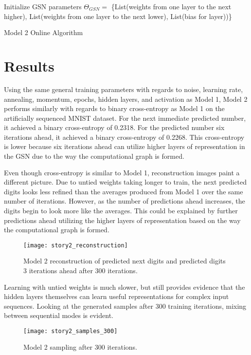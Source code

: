 \begin{algorithm}[h!]
	Initialize GSN parameters \(\Theta_{GSN} = \) \{List(weights from one layer to the next higher), List(weights from one layer to the next lower), List(bias for layer))\}\;
	\caption{ Model 2 Online Algorithm }
\end{algorithm}

\section{Results}

Using the same general training parameters with regards to noise, learning rate, annealing, momentum, epochs, hidden layers, and activation as Model 1, Model 2 performs similarly with regards to binary cross-entropy as Model 1 on the artificially sequenced MNIST dataset. For the next immediate predicted number, it achieved a binary cross-entropy of 0.2318.  For the predicted number six iterations ahead, it achieved a binary cross-entropy of 0.2268. This cross-entropy is lower because six iterations ahead can utilize higher layers of representation in the GSN due to the way the computational graph is formed.

Even though cross-entropy is similar to Model 1, reconstruction images paint a different picture. Due to untied weights taking longer to train, the next predicted digits looks less refined than the averages produced from Model 1 over the same number of iterations. However, as the number of predictions ahead increases, the digits begin to look more like the averages. This could be explained by further predictions ahead utilizing the higher layers of representation based on the way the computational graph is formed.

\begin{figure}[h!]
  \centering
    \texttt{[image: story2\_reconstruction]}
\caption{Model 2 reconstruction of predicted next digits and predicted digits 3 iterations ahead after 300 iterations.}
\end{figure}

Learning with untied weights is much slower, but still provides evidence that the hidden layers themselves can learn useful representations for complex input sequences. Looking at the generated samples after 300 training iterations, mixing between sequential modes is evident.
\begin{figure}[h!]
  \centering
    \texttt{[image: story2\_samples\_300]}
\caption{Model 2 sampling after 300 iterations.}
\end{figure}


